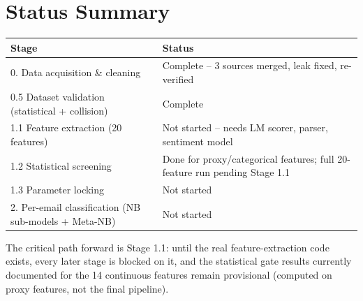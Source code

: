 \documentclass[11pt]{article}
\begin{document}
\section{Status Summary}
\renewcommand{\arraystretch}{1.3}
\begin{table}[h]
\centering
\begin{tabular}{@{}p{5.8cm}p{8.5cm}@{}}
\toprule
\textbf{Stage} & \textbf{Status} \\
\midrule
0. Data acquisition \& cleaning & Complete -- 3 sources merged, leak fixed, re-verified \\
0.5 Dataset validation (statistical + collision) & Complete \\
1.1 Feature extraction (20 features) & Not started -- needs LM scorer, parser, sentiment model \\
1.2 Statistical screening & Done for proxy/categorical features; full 20-feature run pending Stage 1.1 \\
1.3 Parameter locking & Not started \\
2. Per-email classification (NB sub-models + Meta-NB) & Not started \\
\bottomrule
\end{tabular}
\end{table}

The critical path forward is Stage 1.1: until the real feature-extraction code exists, every later stage
is blocked on it, and the statistical gate results currently documented for the 14 continuous features
remain provisional (computed on proxy features, not the final pipeline).
\end{document}
